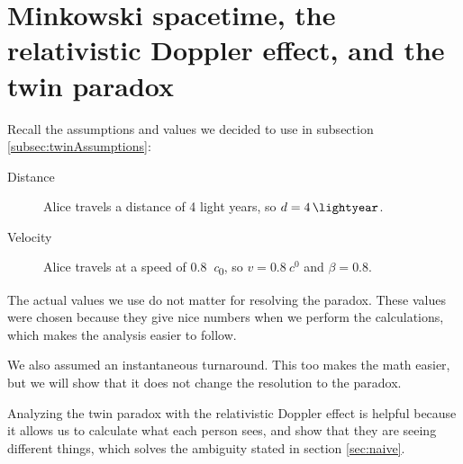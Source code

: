 \section{Minkowski spacetime, the relativistic Doppler effect, and the twin paradox}
	Recall the assumptions and values we decided to use in subsection \ref{subsec:twinAssumptions}:
	\begin{description}
		\item[Distance] Alice travels a distance of 4 light years, so $d = \SI{4}{\lightyear}$.
		\item[Velocity] Alice travels at a speed of \SI{0.8}{\clight}, so $v = \SI{0.8}{\clight}$ and $\beta = 0.8$.
	\end{description}
	The actual values we use do not matter for resolving the paradox.
	These values were chosen because they give nice numbers when we perform the calculations, which makes the analysis easier to follow.

	We also assumed an instantaneous turnaround.
	This too makes the math easier, but we will show that it does not change the resolution to the paradox.

	Analyzing the twin paradox with the relativistic Doppler effect is helpful because it allows us to calculate what each person sees, and show that they are seeing different things, which solves the ambiguity stated in section \ref{sec:naive}.
